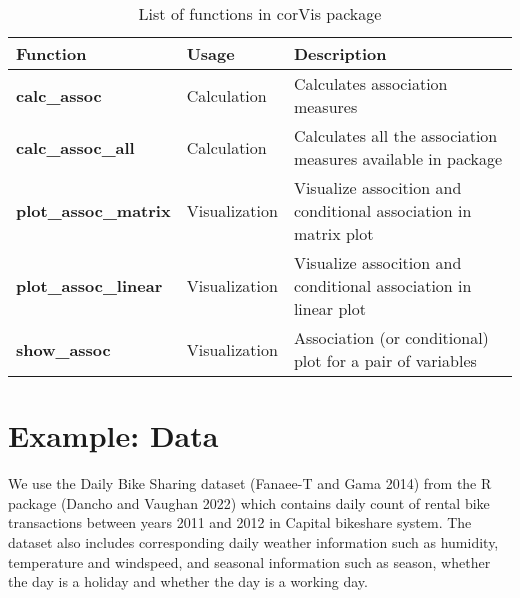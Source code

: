 \begin{table}

\caption{\label{tab:function-corVis}List of functions in corVis package}
\centering
\begin{tabular}[t]{>{}lll}
\toprule
Function & Usage & Description\\
\midrule
\textbf{calc\_assoc} & Calculation & Calculates association measures\\
\textbf{calc\_assoc\_all} & Calculation & Calculates all the association measures available in package\\
\textbf{plot\_assoc\_matrix} & Visualization & Visualize assocition and conditional association in matrix plot\\
\textbf{plot\_assoc\_linear} & Visualization & Visualize assocition and conditional association in linear plot\\
\textbf{show\_assoc} & Visualization & Association (or conditional) plot for a pair of variables\\
\bottomrule
\end{tabular}
\end{table}

\hypertarget{example-data}{%
\section{Example: Data}\label{example-data}}

We use the Daily Bike Sharing dataset (Fanaee-T and Gama 2014) from the R package  (Dancho and Vaughan 2022) which contains daily count of rental bike transactions between years 2011 and 2012 in Capital bikeshare system. The dataset also includes corresponding daily weather information such as humidity, temperature and windspeed, and seasonal information such as season, whether the day is a holiday and whether the day is a working day.

